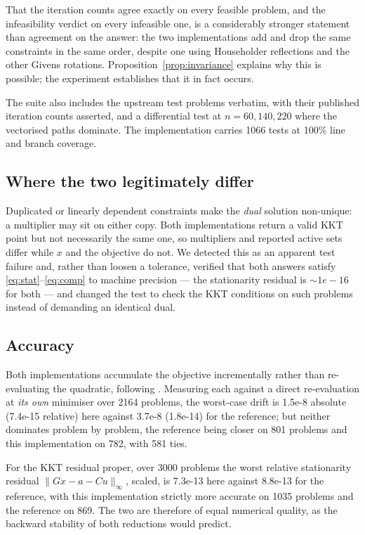 \documentclass[11pt,a4paper]{article}
\theoremstyle{plain}
\theoremstyle{remark}
\begin{document}
\noindent
That the iteration counts agree exactly on every feasible problem, and the
infeasibility verdict on every infeasible one, is a considerably stronger
statement than agreement on the answer: the two implementations add and drop the
same constraints in the same order, despite one using Householder reflections and
the other Givens rotations. Proposition~\ref{prop:invariance} explains why this
is possible; the experiment establishes that it in fact occurs.

The suite also includes the upstream test problems verbatim, with their published
iteration counts asserted, and a differential test at $n = 60, 140, 220$ where
the vectorised paths dominate. The implementation carries 1066 tests at
100\% line and branch coverage.

\subsection{Where the two legitimately differ}

Duplicated or linearly dependent constraints make the \emph{dual} solution
non-unique: a multiplier may sit on either copy. Both implementations return a
valid KKT point but not necessarily the same one, so multipliers and reported
active sets differ while $x$ and the objective do not. We detected this as an
apparent test failure and, rather than loosen a tolerance, verified that both
answers satisfy \eqref{eq:stat}--\eqref{eq:comp} to machine precision --- the
stationarity residual is $\sim\!1e-16$ for both --- and changed the test to
check the KKT conditions on such problems instead of demanding an identical dual.

\subsection{Accuracy}

Both implementations accumulate the objective incrementally rather than
re-evaluating the quadratic, following \citep{goldfarb1983}. Measuring each
against a direct re-evaluation at \emph{its own} minimiser over 2164 problems,
the worst-case drift is 1.5e-8 absolute (7.4e-15 relative) here
against 3.7e-8 (1.8e-14) for the reference; but neither dominates
problem by problem, the reference being closer on 801 problems and this
implementation on 782, with 581 ties.

For the KKT residual proper, over 3000 problems the worst relative stationarity
residual $\lVert Gx - a - Cu \rVert_\infty$, scaled, is 7.3e-13 here
against 8.8e-13 for the reference, with this implementation strictly more
accurate on 1035 problems and the reference on 869. The two are therefore of
equal numerical quality, as the backward stability of both reductions
\citep{wilkinson1965,higham2002} would predict.
\end{document}
